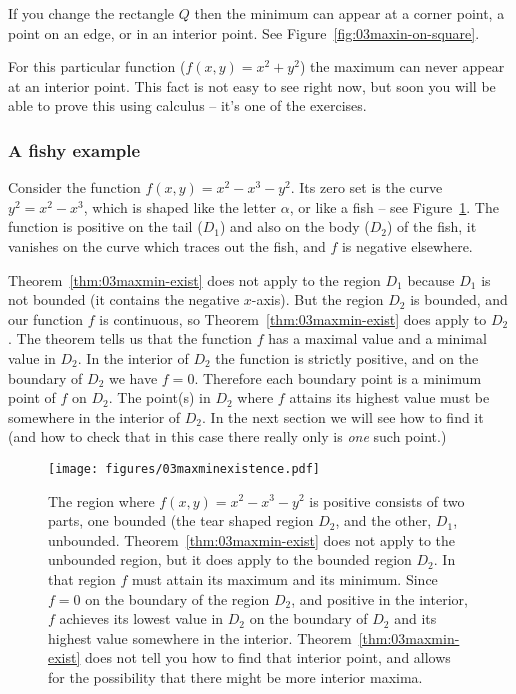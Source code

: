 If you change the rectangle $Q$ then the minimum can appear at a corner
point, a point on an edge, or in an interior point.  See
Figure~\ref{fig:03maxin-on-square}.

For this particular function ($f(x,y) = x^2+y^2$) the maximum can never
appear at an interior point.  This fact is not easy to see right now, but
soon you will be able to prove this using calculus -- it's one of the
exercises.


\subsubsection{A fishy example}  %

\label{sec:cubic-maxmin-exist} 
Consider the function $f(x, y) = x^2-x^3-y^2$.  Its zero set is the curve
$y^2 = x^2-x^3$, which is shaped like the letter $\alpha$, or like a fish
-- see Figure~\ref{fig:03maxmin-exist-in-fish}.  The function is positive
on the tail ($D_1$) and also on the body ($D_2$) of the fish, it vanishes
on the curve which traces out the fish, and $f$ is negative elsewhere.

Theorem~\ref{thm:03maxmin-exist} does not apply to the region $D_1$ because
$D_1$ is not bounded (it contains the negative $x$-axis).  But the region
$D_2$ is bounded, and our function $f$ is continuous, so
Theorem~\ref{thm:03maxmin-exist} does apply to $D_2$.  The theorem tells us
that the function $f$ has a maximal value and a minimal value in $D_2$.  In
the interior of $D_2$ the function is strictly positive, and on the
boundary of $D_2$ we have $f=0$.  Therefore each boundary point is a
minimum point of $f$ on $D_2$.  The point(s) in $D_2$ where $f$ attains its
highest value must be somewhere in the interior of $D_2$.  In the next
section we will see how to find it (and how to check that in this case
there really only is \emph{one} such point.)

\begin{figure}[ht]
  \centering
  \texttt{[image: figures/03maxminexistence.pdf]}
  \caption{The region where $f(x, y) = x^2-x^3-y^2$ is positive consists of
    two parts, one bounded (the tear shaped region $D_2$, and the other,
    $D_1$, unbounded.  Theorem~\ref{thm:03maxmin-exist} does not apply to
    the unbounded region, but it does apply to the bounded region $D_2$. In
    that region $f$ must attain its maximum and its minimum.  Since $f=0$
    on the boundary of the region $D_2$, and positive in the interior, $f$
    achieves its lowest value in $D_2$ on the boundary of $D_2$ and its
    highest value somewhere in the interior.
    Theorem~\ref{thm:03maxmin-exist} does not tell you how to find that
    interior point, and allows for the possibility that there might be more
    interior maxima.}
  \label{fig:03maxmin-exist-in-fish} 
\end{figure}



